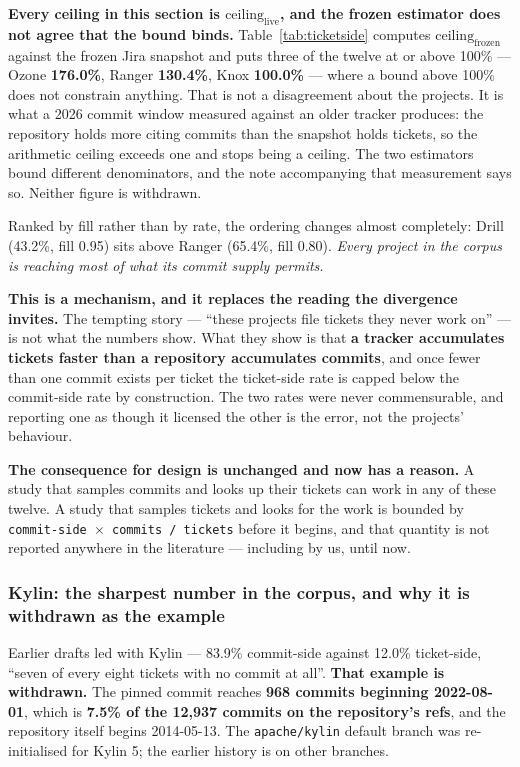 \documentclass[conference]{IEEEtran}
\begin{document}
\textbf{Every ceiling in this section is $\mathrm{ceiling}_\mathrm{live}$, and the frozen estimator does not agree that the bound binds.} Table~\ref{tab:ticketside} computes $\mathrm{ceiling}_\mathrm{frozen}$ against the frozen Jira snapshot and puts three of the twelve at or above 100\% --- Ozone \textbf{176.0\%}, Ranger \textbf{130.4\%}, Knox \textbf{100.0\%} --- where a bound above 100\% does not constrain anything. That is not a disagreement about the projects. It is what a 2026 commit window measured against an older tracker produces: the repository holds more citing commits than the snapshot holds tickets, so the arithmetic ceiling exceeds one and stops being a ceiling. The two estimators bound different denominators, and the note accompanying that measurement says so. Neither figure is withdrawn.

Ranked by fill rather than by rate, the ordering changes almost completely: Drill (43.2\%, fill 0.95) sits above Ranger (65.4\%, fill 0.80). \emph{Every project in the corpus is reaching most of what its commit supply permits.}

\textbf{This is a mechanism, and it replaces the reading the divergence invites.} The tempting story --- ``these projects file tickets they never work on'' --- is not what the numbers show. What they show is that \textbf{a tracker accumulates tickets faster than a repository accumulates commits}, and once fewer than one commit exists per ticket the ticket-side rate is capped below the commit-side rate by construction. The two rates were never commensurable, and reporting one as though it licensed the other is the error, not the projects' behaviour.

\textbf{The consequence for design is unchanged and now has a reason.} A study that samples commits and looks up their tickets can work in any of these twelve. A study that samples tickets and looks for the work is bounded by \texttt{commit-\allowbreak{}side $\times$ commits /\allowbreak{} tickets} before it begins, and that quantity is not reported anywhere in the literature --- including by us, until now.

\subsubsection{Kylin: the sharpest number in the corpus, and why it is withdrawn as the example}
\label{sec:4.2.1}

Earlier drafts led with Kylin --- 83.9\% commit-side against 12.0\% ticket-side, ``seven of every eight tickets with no commit at all''. \textbf{That example is withdrawn.} The pinned commit reaches \textbf{968 commits beginning 2022-08-01}, which is \textbf{7.5\% of the 12,937 commits on the repository's refs}, and the repository itself begins 2014-05-13. The \texttt{apache/\allowbreak{}kylin} default branch was re-initialised for Kylin 5; the earlier history is on other branches.
\end{document}
